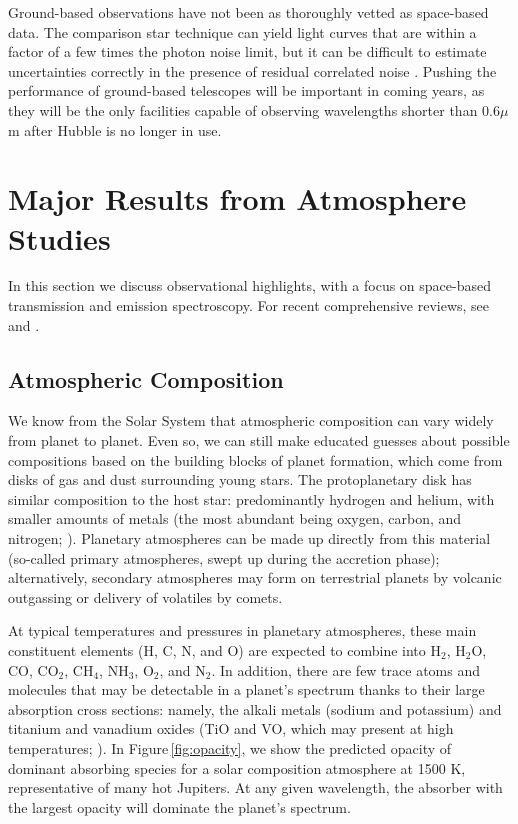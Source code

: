 \documentclass[graybox,natbib,nosecnum]{svmult}
\begin{document}
Ground-based observations have not been as thoroughly vetted as space-based data.  The comparison star technique can yield light curves that are within a factor of a few times the photon noise limit, but it can be difficult to estimate uncertainties correctly in the presence of residual correlated noise \citep[e.g.][]{jordan13, beatty16}.  Pushing the performance of ground-based telescopes will be important in coming years, as they will be the only facilities capable of observing wavelengths shorter than $0.6\mu$m after Hubble is no longer in use. 

\section{Major Results from Atmosphere Studies}
In this section we discuss observational highlights, with a focus on space-based transmission and emission spectroscopy.  For recent comprehensive reviews, see \cite{crossfield15} and \cite{deming17}. 

\subsection{Atmospheric Composition}
We know from the Solar System that atmospheric composition can vary widely from planet to planet. Even so, we can still make educated guesses about possible compositions based on the building blocks of planet formation,  which come from disks of gas and dust surrounding young stars.  The protoplanetary disk has similar composition to the host star: predominantly hydrogen and helium, with smaller amounts of metals (the most abundant being oxygen, carbon, and nitrogen; \citealt{anders89}).  Planetary atmospheres can be made up directly from this material (so-called primary atmospheres, swept up during the accretion phase);  alternatively, secondary atmospheres may form on terrestrial planets by volcanic outgassing or delivery of volatiles by comets.  

At typical temperatures and pressures in planetary atmospheres, these main constituent elements (H, C, N, and O) are expected to combine into H$_2$, H$_2$O, CO, CO$_2$, CH$_4$, NH$_3$, O$_2$, and N$_2$.  In addition, there are few trace atoms and molecules that may be detectable in a planet's spectrum thanks to their large absorption cross sections: namely, the alkali metals (sodium and potassium) and titanium and vanadium oxides (TiO and VO, which may present at high temperatures; \citealt{fortney08}). In Figure\,\ref{fig:opacity}, we show the predicted opacity of dominant absorbing species for a solar composition atmosphere at 1500 K, representative of many hot Jupiters. At any given wavelength, the absorber with the largest opacity will dominate the planet's spectrum.
\end{document}
